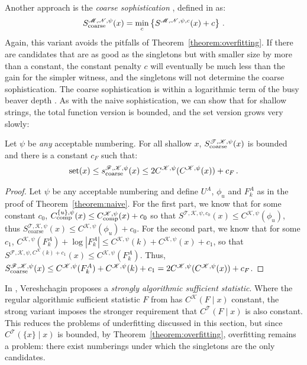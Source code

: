 \documentclass{style/llncs}
\newcommand{\M}{\mathscr M}
\newcommand{\T}{\mathscr T}
\newcommand{\F}{\mathscr F}
\newcommand{\K}{\mathscr K}
\newcommand{\Nm}{\mathscr N}
\newcommand{\tn}[1]{\textnormal{#1}}
\newcommand{\s}{S}
\newcommand{\Cc}{C_\tn{comp}}
\newcommand{\p}{\,\text{.}}
\begin{document}
Another approach is the \emph{coarse sophistication} \cite{antunes2009sophistication}, defined in \cite{mota2013sophistication} as:
\[
S^{\M,\Nm,\psi}_\tn{coarse}(x) = \min_c\left\{S^{\M,\Nm,\psi,c}(x) + c \right\} \p
\]
Again, this variant avoids the pitfalls of Theorem~\ref{theorem:overfitting}. If there are candidates that are as good as the singletons but with smaller size by more than a constant, the constant penalty $c$ will eventually be much less than the gain for the simpler witness, and the singletons will not determine the coarse sophistication. The coarse sophistication is within a logarithmic term of the busy beaver depth \cite{antunes2009sophistication}. As with the naive sophistication, we can show that for shallow strings, the total function version is bounded, and the set version grows very slowly:
\begin{theorem}
Let $\psi$ be \emph{any} acceptable numbering. For all shallow $x$, $\s_\tn{coarse}^{\T,\K,\psi}(x)$ is bounded and there is a constant $c_F$ such that:\belowdisplayskip=-12pt
\[
\text{set}(x) \leq s_\tn{coarse}^{\F,\K,\psi}(x) \leq 2 C^{\K,\psi}(C^{\K,\psi}(x)) + c_F \p
\]\label{theorem:coarse}
\end{theorem}
\begin{proof}
Let $\psi$ be any acceptable numbering and define $U^A$, $\phi_u$ and $F^A_k$ as in the proof of Theorem~\ref{theorem:naive}. For the first part, we know that for some constant $c_0$, $\Cc^{\{u\}, \psi}(x) \leq \Cc^{\K,\psi}(x) + c_0$ so that $S^{\T, \K,\psi,c_0}(x) \leq C^{\K,\psi}(\phi_u)$, thus $S_\text{coarse}^{\T,\K,\psi}(x) \leq C^{\K,\psi}(\phi_u) + c_0$. For the second part, we know that for some $c_1$, $C^{\K,\psi}(F^A_k) + \log|F^A_k| \leq C^{\K,\psi}(k) + C^{\K,\psi}(x)+ c_1$, so that $S^{\F,\K,\psi,C^\K(k)+c_1}(x) \leq C^{\K,\psi}(F^A_k)$. Thus, $S_\tn{coarse}^{\F,\K,\psi}(x) \leq C^{\K,\psi}(F^A_k) + C^{\K,\psi}(k) + c_1 = 2 C^{\K,\psi}(C^{\K,\psi}(x)) + c_F$.
\end{proof}
In \cite{vereshchagin2013algorithmic}, Vereshchagin proposes a \emph{strongly algorithmic sufficient statistic}. Where the regular algorithmic sufficient statistic $F$ from \cite{gacs2001algorithmic} has $C^\K(F\mid x)$ constant, the strong variant imposes the stronger requirement that $C^\T(F\mid x)$ is also constant. This reduces the problems of underfitting discussed in this section, but since $C^\T(\{x\}\mid x)$ is bounded, by Theorem~\ref{theorem:overfitting}, overfitting remains a problem: there exist numberings under which the singletons are the only candidates.
\end{document}
